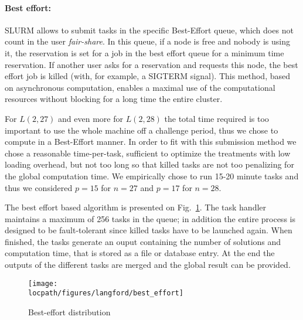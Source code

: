 \paragraph{Best effort: }
SLURM allows to submit tasks in the specific Best-Effort queue, which does not count in the user \textit{fair-share}. In this queue, if a node is free and nobody is using it, the reservation is set for a job in the best effort queue for a minimum time reservation. 
If another user asks for a reservation and requests this node, the best effort job is killed (with, for example, a SIGTERM signal). This method, based on asynchronous computation, enables a maximal use of the computational resources without blocking for a long time the entire cluster.

For $L(2,27)$ and even more for $L(2,28)$ the total time required is too important to use the whole machine off a challenge period, thus we chose to compute in a Best-Effort manner.
In order to fit with this submission method we chose a reasonable time-per-task, sufficient to optimize the treatments with low loading overhead, but not too long so that killed tasks are not too penalizing for the global computation time. We empirically chose to run 15-20 minute tasks and thus we considered $p=15$ for $n=27$ and $p=17$ for $n=28$. 

The best effort based algorithm is presented on Fig.~\ref{fig:graphe_besteffort}.
The task handler maintains a maximum of 256 tasks in the queue; in addition the entire process is designed to be fault-tolerant since killed tasks have to be launched again.
When finished, the tasks generate an ouput containing the number of solutions and computation time, that is stored as a file or database entry. 
At the end the outputs of the different tasks are merged and the global result can be provided.  

\begin{figure}[htbp]
\centering
\texttt{[image: \\locpath/figures/langford/best\_effort]}
\caption{Best-effort distribution}
\label{fig:graphe_besteffort}
\end{figure}

